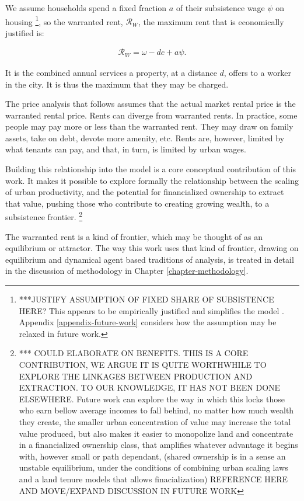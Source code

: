 We assume households spend a fixed fraction $a$ of their subsistence wage $\psi$ on housing \footnote{***JUSTIFY ASSUMPTION OF FIXED SHARE OF SUBSISTENCE HERE? This appears to be empirically justified and simplifies the model \cite{SOURCE_HOUSING_A_FIXED_SHARE_SUBSISTENCE_WAGE}. Appendix \ref{appendix-future-work} considers how the assumption may be relaxed in future work.}, so the warranted rent, $\mathcal{R}_W$, the maximum rent that is economically justified is:

\begin{align}
\mathcal{R}_W=\omega- {dc} + a\psi.
\label{eqn-housing-price}
\end{align}

It is the combined annual services a property, at a distance $d$, offers to a worker in the city. It is thus the maximum that they may be charged.

The price analysis that follows assumes that the actual market rental price is the warranted rental price. Rents can diverge from warranted rents. In practice, some people may pay more or less than the warranted rent. They may draw on family assets, take on debt, devote more amenity, etc. Rents are, however, limited by what tenants can pay, and that, in turn, is limited by urban wages. 

Building this relationship into the model is a core conceptual contribution of this work. It makes it possible to explore formally the relationship between the scaling of urban productivity, and the potential for financialized ownership to extract that value, pushing those who contribute to creating growing wealth, to a subsistence frontier.  \footnote{*** COULD ELABORATE ON BENEFITS. THIS IS A CORE CONTRIBUTION, WE ARGUE IT IS QUITE WORTHWHILE TO EXPLORE THE LINKAGES BETWEEN PRODUCTION AND EXTRACTION. TO OUR KNOWLEDGE, IT HAS NOT BEEN DONE ELSEWHERE. Future work can explore the way in which this locks those who earn bellow average incomes to fall behind, no matter how much wealth they create, the smaller urban concentration of value may increase the total value produced, but also makes it easier to monopolize land and concentrate in a financialized ownership class, that amplifies whatever advantage it begins with, however small or path dependant, (shared ownership is in a sense an unstable equilibrium, under the conditions of combining urban scaling laws and a land tenure models that allows finacialization)  REFERENCE HERE AND  MOVE/EXPAND DISCUSSION IN FUTURE WORK}

The warranted rent %
is a kind of frontier, which may be thought of as an equilibrium or attractor. The way this work uses that kind of frontier, drawing on equilibrium and dynamical agent based traditions of analysis, is treated in detail in the discussion of methodology in Chapter \ref{chapter-methodology}.

